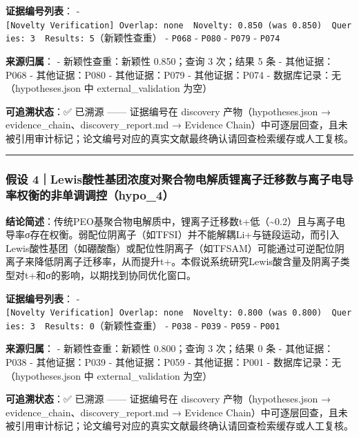 \documentclass[12pt,a4paper]{ctexart}
\begin{document}
\textbf{证据编号列表}： - \texttt{{[}Novelty\ Verification{]}\ Overlap:\ none\ \textbar{}\ Novelty:\ 0.850\ (was\ 0.850)\ \textbar{}\ Queries:\ 3\ \textbar{}\ Results:\ 5}（新颖性查重） - \texttt{P068} - \texttt{P080} - \texttt{P079} - \texttt{P074}

\textbf{来源归属}： - 新颖性查重：新颖性 0.850；查询 3 次；结果 5 条 - 其他证据：P068 - 其他证据：P080 - 其他证据：P079 - 其他证据：P074 - 数据库记录：无（hypotheses.json 中 external\_validation 为空）

\textbf{可追溯状态}：✅ 已溯源 ------ 证据编号在 discovery 产物（hypotheses.json → evidence\_chain、discovery\_report.md → Evidence Chain）中可逐层回查，且未被引用审计标记；论文编号对应的真实文献最终确认请回查检索缓存或人工复核。

\begin{center}\rule{0.5\linewidth}{0.5pt}\end{center}

\subsubsection{假设 4｜Lewis酸性基团浓度对聚合物电解质锂离子迁移数与离子电导率权衡的非单调调控（hypo\_4）}\label{ux5047ux8bbe-4lewisux9178ux6027ux57faux56e2ux6d53ux5ea6ux5bf9ux805aux5408ux7269ux7535ux89e3ux8d28ux9502ux79bbux5b50ux8fc1ux79fbux6570ux4e0eux79bbux5b50ux7535ux5bfcux7387ux6743ux8861ux7684ux975eux5355ux8c03ux8c03ux63a7hypo_4}

\textbf{结论简述}：传统PEO基聚合物电解质中，锂离子迁移数t+低（\textasciitilde0.2）且与离子电导率σ存在权衡。弱配位阴离子（如TFSI）并不能解耦Li+与链段运动，而引入Lewis酸性基团（如硼酸酯）或配位性阴离子（如TFSAM）可能通过可逆配位阴离子来降低阴离子迁移率，从而提升t+。本假说系统研究Lewis酸含量及阴离子类型对t+和σ的影响，以期找到协同优化窗口。

\textbf{证据编号列表}： - \texttt{{[}Novelty\ Verification{]}\ Overlap:\ none\ \textbar{}\ Novelty:\ 0.800\ (was\ 0.800)\ \textbar{}\ Queries:\ 3\ \textbar{}\ Results:\ 0}（新颖性查重） - \texttt{P038} - \texttt{P039} - \texttt{P059} - \texttt{P001}

\textbf{来源归属}： - 新颖性查重：新颖性 0.800；查询 3 次；结果 0 条 - 其他证据：P038 - 其他证据：P039 - 其他证据：P059 - 其他证据：P001 - 数据库记录：无（hypotheses.json 中 external\_validation 为空）

\textbf{可追溯状态}：✅ 已溯源 ------ 证据编号在 discovery 产物（hypotheses.json → evidence\_chain、discovery\_report.md → Evidence Chain）中可逐层回查，且未被引用审计标记；论文编号对应的真实文献最终确认请回查检索缓存或人工复核。
\end{document}
